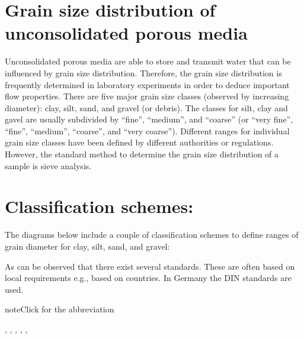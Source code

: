 \documentclass[letterpaper,10pt,english]{jupyterBook}
\let\sphinxpxdimen\pdfpxdimen\else\newdimen\sphinxpxdimen
\begin{document}
\section{Grain size distribution of unconsolidated porous media}
\label{\detokenize{content/flow/12_subsurface_structure:grain-size-distribution-of-unconsolidated-porous-media}}
\sphinxAtStartPar
Unconsolidated porous media are able to store and transmit water that can be influenced by grain size distribution. Therefore, the grain size distribution is frequently determined in laboratory experiments in order to deduce important flow properties.
There are five major grain size classes (observed by increasing diameter): clay, silt, sand, and gravel (or debris). The classes for silt, clay and gavel are usually subdivided by “fine”, “medium”, and “coarse” (or “very fine”, “fine”, “medium”, “coarse”, and “very coarse”). Different ranges for individual grain size classes have been defined by different authorities or regulations. However, the standard method to determine the grain size distribution of a sample is sieve analysis.


\section{Classification schemes:}
\label{\detokenize{content/flow/12_subsurface_structure:classification-schemes}}
\sphinxAtStartPar
The diagrams below include a couple of classification schemes to define ranges of grain diameter for clay, silt, sand, and gravel:

\noindent{\hspace*{\fill}\sphinxincludegraphics[width=600\sphinxpxdimen]{{L02_fig7}.png}\hspace*{\fill}}

\sphinxAtStartPar
As can be observed that there exist several standards. These are often based on local requirements e.g., based on countries. In Germany the DIN standards are used.

\begin{sphinxadmonition}{note}{Click for the abbreviation}

\sphinxAtStartPar
{},
,
,
,
,
\end{sphinxadmonition}
\end{document}
